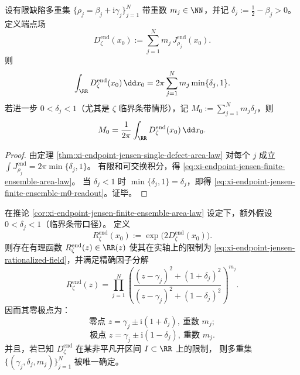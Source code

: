 
\begin{corollary}[有限缺陷系综的可加面积律与质量读出]\label{cor:xi-endpoint-jensen-finite-ensemble-area-law}
设有限缺陷多重集
\(
\{\rho_j=\beta_j+\mathrm{i}\gamma_j\}_{j=1}^{N}
\)
带重数 \(m_j\in\NN\)，并记 \(\delta_j:=\tfrac12-\beta_j>0\)。
定义端点场
\begin{equation}\label{eq:xi-endpoint-jensen-finite-ensemble-field}
D_{\zeta}^{\mathrm{end}}(x_0)
:=\sum_{j=1}^{N}m_j\,J_{\rho_j}^{\mathrm{end}}(x_0).
\end{equation}
则
\begin{equation}\label{eq:xi-endpoint-jensen-finite-ensemble-area-law}
\int_{\RR}D_{\zeta}^{\mathrm{end}}(x_0)\,\dd x_0
=2\pi\sum_{j=1}^{N}m_j\min\{\delta_j,1\}.
\end{equation}
若进一步 \(0<\delta_j<1\)（尤其是 \(\zeta\) 临界条带情形），记
\(
M_0:=\sum_{j=1}^{N}m_j\delta_j
\)，则
\begin{equation}\label{eq:xi-endpoint-jensen-finite-ensemble-m0-readout}
M_0=\frac{1}{2\pi}\int_{\RR}D_{\zeta}^{\mathrm{end}}(x_0)\,\dd x_0.
\end{equation}
\end{corollary}

\begin{proof}
由定理 \ref{thm:xi-endpoint-jensen-single-defect-area-law} 对每个 \(j\) 成立
\(
\int J_{\rho_j}^{\mathrm{end}}=2\pi\min\{\delta_j,1\}
\)。
有限和可交换积分，得
\eqref{eq:xi-endpoint-jensen-finite-ensemble-area-law}。
当 \(\delta_j<1\) 时 \(\min\{\delta_j,1\}=\delta_j\)，即得
\eqref{eq:xi-endpoint-jensen-finite-ensemble-m0-readout}。证毕。
\end{proof}

\begin{theorem}[端点场指数化函数的有理因子化与唯一反演]\label{thm:xi-endpoint-jensen-rational-factorization-inversion}
在推论 \ref{cor:xi-endpoint-jensen-finite-ensemble-area-law} 设定下，额外假设
\(
0<\delta_j<1
\)（临界条带口径）。
定义
\begin{equation}\label{eq:xi-endpoint-jensen-rationalized-field}
R_{\zeta}^{\mathrm{end}}(x_0):=\exp\!\bigl(2D_{\zeta}^{\mathrm{end}}(x_0)\bigr).
\end{equation}
则存在有理函数 \(R_{\zeta}^{\mathrm{end}}(z)\in\RR(z)\) 使其在实轴上的限制为 \eqref{eq:xi-endpoint-jensen-rationalized-field}，并满足精确因子分解
\begin{equation}\label{eq:xi-endpoint-jensen-rational-factorization}
R_{\zeta}^{\mathrm{end}}(z)
=\prod_{j=1}^{N}
\left(
\frac{(z-\gamma_j)^2+(1+\delta_j)^2}
{(z-\gamma_j)^2+(1-\delta_j)^2}
\right)^{m_j}.
\end{equation}
因而其零极点为：
\[
\text{零点 }z=\gamma_j\pm \mathrm{i}(1+\delta_j),\ \text{重数 }m_j;
\]
\[
\text{极点 }z=\gamma_j\pm \mathrm{i}(1-\delta_j),\ \text{重数 }m_j.
\]
并且，若已知 \(D_{\zeta}^{\mathrm{end}}\) 在某非平凡开区间 \(I\subset\RR\) 上的限制，
则多重集 \(\{(\gamma_j,\delta_j,m_j)\}_{j=1}^{N}\) 被唯一确定。
\end{theorem}

